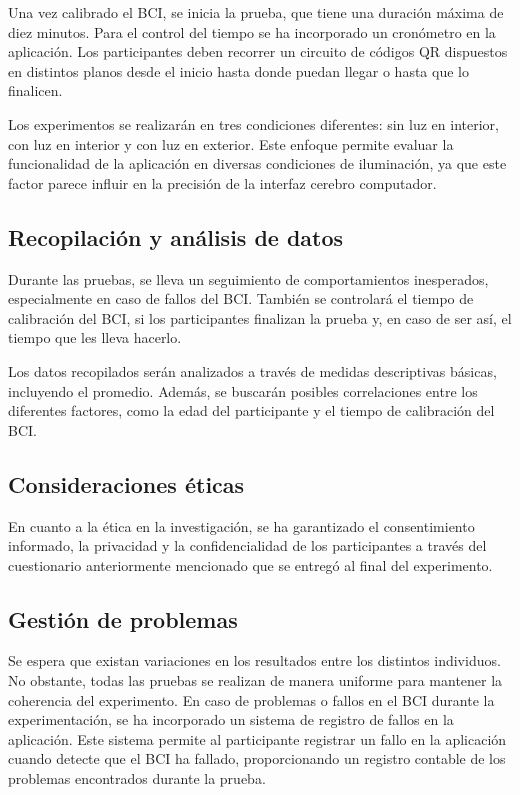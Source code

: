 Una vez calibrado el BCI, se inicia la prueba, que tiene una duración máxima de diez minutos. Para el control del tiempo se ha incorporado un cronómetro en la aplicación. Los participantes deben recorrer un circuito de códigos QR dispuestos en distintos planos desde el inicio hasta donde puedan llegar o hasta que lo finalicen.

Los experimentos se realizarán en tres condiciones diferentes: sin luz en interior, con luz en interior y con luz en exterior. Este enfoque permite evaluar la funcionalidad de la aplicación en diversas condiciones de iluminación, ya que este factor parece influir en la precisión de la interfaz cerebro computador.



\subsection{Recopilación y análisis de datos}

Durante las pruebas, se lleva un seguimiento de comportamientos inesperados, especialmente en caso de fallos del BCI. También se controlará el tiempo de calibración del BCI, si los participantes finalizan la prueba y, en caso de ser así, el tiempo que les lleva hacerlo.



Los datos recopilados serán analizados a través de medidas descriptivas básicas, incluyendo el promedio. Además, se buscarán posibles correlaciones entre los diferentes factores, como la edad del participante y el tiempo de calibración del BCI.



\subsection{Consideraciones éticas}

En cuanto a la ética en la investigación, se ha garantizado el consentimiento informado, la privacidad y la confidencialidad de los participantes a través del cuestionario anteriormente mencionado que se entregó al final del experimento.



\subsection{Gestión de problemas}

Se espera que existan variaciones en los resultados entre los distintos individuos. No obstante, todas las pruebas se realizan de manera uniforme para mantener la coherencia del experimento. En caso de problemas o fallos en el BCI durante la experimentación, se ha incorporado un sistema de registro de fallos en la aplicación. Este sistema permite al participante registrar un fallo en la aplicación cuando detecte que el BCI ha fallado, proporcionando un registro contable de los problemas encontrados durante la prueba.